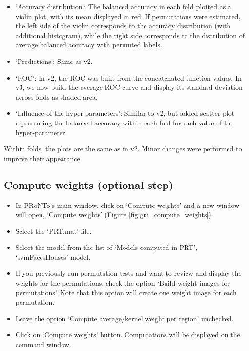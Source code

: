 \begin{itemize}
    \item `Accuracy distribution': The balanced accuracy in each fold plotted as a violin plot, with its mean displayed in red. If permutations were estimated, the left side of the violin corresponds to the accuracy distribution (with additional histogram), while the right side corresponds to the distribution of average balanced accuracy with permuted labels.

    \item `Predictions': Same as v2.

    \item `ROC': In v2, the ROC was built from the concatenated function values. In v3, we now build the average ROC curve and display its standard deviation across folds as shaded area.

    \item `Influence of the hyper-parameters': Similar to v2, but added scatter plot representing the balanced accuracy within each fold for each value of the hyper-parameter.

\end{itemize}

\noindent Within folds, the plots are the same as in v2. Minor changes were performed to improve their appearance.
	

\subsection{Compute weights (optional step)}

\begin{itemize}
\item In PRoNTo's main window, click on `Compute weights' and a new window will open, `Compute weights' (Figure \ref{fig:gui_compute_weights}).

\item Select the `PRT.mat' file.

\item Select the model from the list of `Models computed in PRT', `svmFacesHouses' model.

\item If you previously run permutation tests and want to review and display the weights for the permutations, check the option `Build weight images for permutations'. Note that this option will create one weight image for each permutation.

\item Leave the option `Compute average/kernel weight per region' unchecked.

\item Click on `Compute weights' button. Computations will be displayed on the \matlab{} command window.

\end{itemize}

